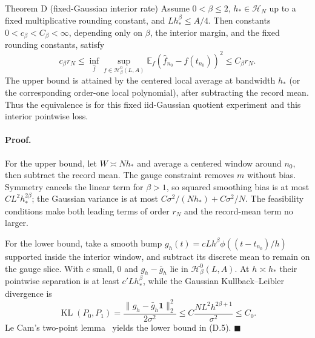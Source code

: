 \begin{namedthm}{Theorem D (fixed-Gaussian interior rate)}
Assume $0<\beta\le2$, $h_*\in\mathcal H_N$ up to a fixed multiplicative rounding constant, and $Lh_*^\beta\le A/4$. Then constants $0<c_\beta<C_\beta<\infty$, depending only on $\beta$, the interior margin, and the fixed rounding constants, satisfy
\begin{equation}
c_\beta r_N
\le
\inf_{\hat f}\sup_{f\in\mathcal H_\beta^0(L,A)}
\mathbb E_f(\hat f_{n_0}-f(t_{n_0}))^2
\le C_\beta r_N .
\tag{D.5}
\end{equation}
The upper bound is attained by the centered local average at bandwidth $h_*$ (or the corresponding order-one local polynomial), after subtracting the record mean. Thus the equivalence is for this fixed iid-Gaussian quotient experiment and this interior pointwise loss.
\end{namedthm}

\paragraph{Proof.} For the upper bound, let $W\asymp Nh_*$ and average a centered window around $n_0$, then subtract the record mean. The gauge constraint removes $m$ without bias. Symmetry cancels the linear term for $\beta>1$, so squared smoothing bias is at most $C L^2h_*^{2\beta}$; the Gaussian variance is at most $C\sigma^2/(Nh_*)+C\sigma^2/N$. The feasibility conditions make both leading terms of order $r_N$ and the record-mean term no larger.

For the lower bound, take a smooth bump $g_h(t)=cLh^\beta\phi((t-t_{n_0})/h)$ supported inside the interior window, and subtract its discrete mean to remain on the gauge slice. With $c$ small, $0$ and $g_h-\bar g_h$ lie in $\mathcal H_\beta^0(L,A)$. At $h\asymp h_*$ their pointwise separation is at least $c'Lh_*^\beta$, while the Gaussian Kullback--Leibler divergence is
\[
\operatorname{KL}(P_0,P_1)
=\frac{\|g_h-\bar g_h\mathbf1\|_2^2}{2\sigma^2}
\le C\frac{NL^2h^{2\beta+1}}{\sigma^2}\le C_0.
\]
Le Cam's two-point lemma~\cite{Tsybakov2009} yields the lower bound in (D.5). \hfill$\blacksquare$

